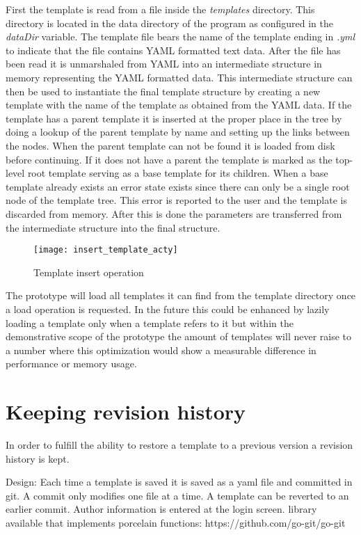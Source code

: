 First the template is read from a file inside the \emph{templates} directory.
This directory is located in the data directory of the program as configured in the \emph{dataDir} variable.
The template file bears the name of the template ending in \emph{.yml} to indicate that the file contains YAML formatted text data.
After the file has been read it is unmarshaled from YAML into an intermediate structure in memory representing the YAML formatted data.
This intermediate structure can then be used to instantiate the final template structure by creating a new template with the name of the template as obtained from the YAML data.
If the template has a parent template it is inserted at the proper place in the tree by doing a lookup of the parent template by name and setting up the links between the nodes.
When the parent template can not be found it is loaded from disk before continuing.
If it does not have a parent the template is marked as the top-level root template serving as a base template for its children.
When a base template already exists an error state exists since there can only be a single root node of the template tree.
This error is reported to the user and the template is discarded from memory.
After this is done the parameters are transferred from the intermediate structure into the final structure.

\begin{figure}[h!]
	\centering
	\texttt{[image: insert\_template\_acty]}
	\caption{Template insert operation}
	\label{fig:inserttemplate}
\end{figure}

The prototype will load all templates it can find from the template directory once a load operation is requested.
In the future this could be enhanced by lazily loading a template only when a template refers to it but within the demonstrative scope of the prototype the amount of templates will never raise to a number where this optimization would show a measurable difference in performance or memory usage.

\section{Keeping revision history}
In order to fulfill the ability to restore a template to a previous version a revision history is kept.


Design:
Each time a template is saved it is saved as a yaml file and committed in git.
A commit only modifies one file at a time.
A template can be reverted to an earlier commit.
Author information is entered at the login screen.
library available that implements porcelain functions:
https://github.com/go-git/go-git

